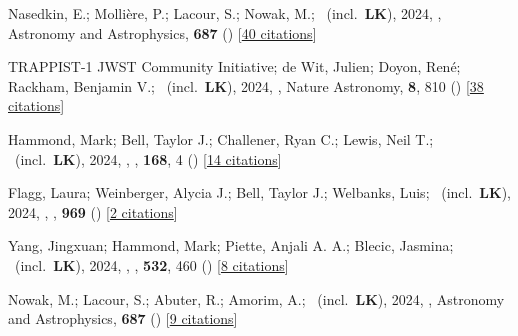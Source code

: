 \item[{\color{numcolor}\scriptsize115}] Nasedkin, E.; Molli{\`e}re, P.; Lacour, S.; Nowak, M.; \etal\ (incl.\ \textbf{LK}), 2024, , Astronomy and Astrophysics, \textbf{687} () [\href{https://ui.adsabs.harvard.edu/abs/2024A&A...687A.298N}{40 citations}]

\item[{\color{numcolor}\scriptsize114}] TRAPPIST-1 JWST Community Initiative; de Wit, Julien; Doyon, Ren{\'e}; Rackham, Benjamin V.; \etal\ (incl.\ \textbf{LK}), 2024, , Nature Astronomy, \textbf{8}, 810 () [\href{https://ui.adsabs.harvard.edu/abs/2024NatAs...8..810T}{38 citations}]

\item[{\color{numcolor}\scriptsize113}] Hammond, Mark; Bell, Taylor J.; Challener, Ryan C.; Lewis, Neil T.; \etal\ (incl.\ \textbf{LK}), 2024, , \aj, \textbf{168}, 4 () [\href{https://ui.adsabs.harvard.edu/abs/2024AJ....168....4H}{14 citations}]

\item[{\color{numcolor}\scriptsize112}] Flagg, Laura; Weinberger, Alycia J.; Bell, Taylor J.; Welbanks, Luis; \etal\ (incl.\ \textbf{LK}), 2024, , \apj, \textbf{969} () [\href{https://ui.adsabs.harvard.edu/abs/2024ApJ...969L..19F}{2 citations}]

\item[{\color{numcolor}\scriptsize111}] Yang, Jingxuan; Hammond, Mark; Piette, Anjali A. A.; Blecic, Jasmina; \etal\ (incl.\ \textbf{LK}), 2024, , \mnras, \textbf{532}, 460 () [\href{https://ui.adsabs.harvard.edu/abs/2024MNRAS.532..460Y}{8 citations}]

\item[{\color{numcolor}\scriptsize110}] Nowak, M.; Lacour, S.; Abuter, R.; Amorim, A.; \etal\ (incl.\ \textbf{LK}), 2024, , Astronomy and Astrophysics, \textbf{687} () [\href{https://ui.adsabs.harvard.edu/abs/2024A&A...687A.248N}{9 citations}]

